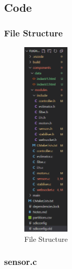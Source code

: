 \pagebreak
\subsection{Code}
\label{app:firmware-code}

\subsubsection{File Structure}
\begin{figure}[H]
    \centering
    \includegraphics[width=0.2\textwidth]{img/code-files.PNG}
    \caption{File Structure}
\end{figure}

\subsubsection{sensor.c}


